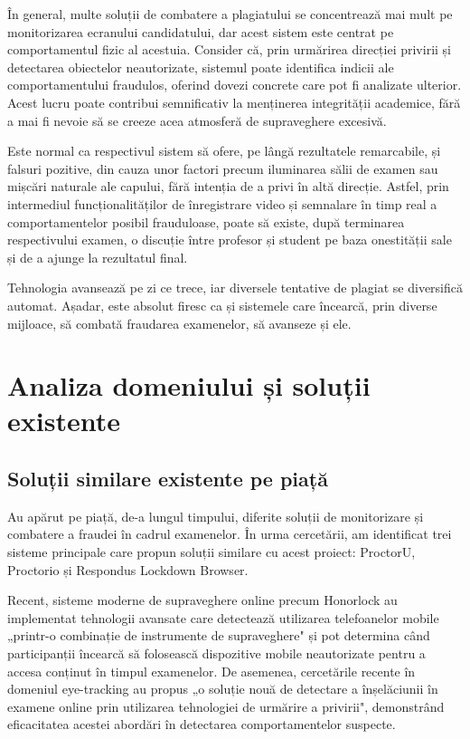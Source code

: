 \documentclass[12pt,a4paper]{article}
\begin{document}
În general, multe soluții de combatere a plagiatului se concentrează mai mult 
pe monitorizarea ecranului candidatului, dar acest sistem este centrat pe 
comportamentul fizic al acestuia. Consider că, prin urmărirea direcției privirii 
și detectarea obiectelor neautorizate, sistemul poate identifica indicii ale
comportamentului fraudulos, oferind dovezi concrete care pot fi analizate ulterior. 
Acest lucru poate contribui semnificativ la menținerea integrității academice, 
fără a mai fi nevoie să se creeze acea atmosferă de supraveghere excesivă.

Este normal ca respectivul sistem să ofere, pe lângă rezultatele
remarcabile, și falsuri pozitive, din cauza unor factori precum
iluminarea sălii de examen sau mișcări naturale ale capului, fără
intenția de a privi în altă direcție. Astfel, prin intermediul
funcționalităților de înregistrare video și semnalare în timp real a
comportamentelor posibil frauduloase, poate să existe, după terminarea
respectivului examen, o discuție între profesor și student pe baza
onestității sale și de a ajunge la rezultatul final. 

Tehnologia avansează pe zi ce trece, iar diversele tentative de plagiat se diversifică automat.
Așadar, este absolut firesc ca și sistemele care încearcă, prin
diverse mijloace, să combată fraudarea examenelor, să avanseze și ele.

\section{Analiza domeniului și soluții existente}

\subsection{Soluții similare existente pe piață}

Au apărut pe piață, de-a lungul timpului, diferite soluții de
monitorizare și combatere a fraudei în cadrul examenelor. În urma cercetării, am identificat
trei sisteme principale care propun soluții similare cu acest proiect: ProctorU\cite{proctoru}, 
Proctorio\cite{proctorio} și Respondus Lockdown Browser\cite{respondus}.

Recent, sisteme moderne de supraveghere online precum Honorlock au implementat tehnologii avansate 
care detectează utilizarea telefoanelor mobile „printr-o combinație de instrumente de supraveghere" și pot
determina când participanții încearcă să folosească dispozitive mobile neautorizate pentru a accesa 
conținut în timpul examenelor\cite{honorlock_detection}. De asemenea, cercetările recente în domeniul 
eye-tracking au propus „o soluție nouă de detectare a înșelăciunii în examene online prin utilizarea 
tehnologiei de urmărire a privirii"\cite{eye_tracking_exams}, demonstrând eficacitatea acestei abordări
în detectarea comportamentelor suspecte.
\end{document}
